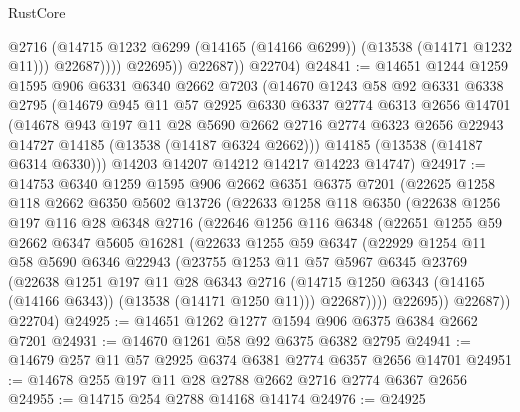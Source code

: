 \begin{lexlean}{RustCore}
\begin{coremodule}
                      @2716
                      (@14715 @1232 @6299 (@14165 (@14166 @6299)) (@13538 (@14171 @1232 @11)))
                      @22687))))
              @22695))
          @22687))
      @22704)
@24841 := @14651
    @1244
    @1259
    @1595
    @906
    @6331
    @6340
    @2662
    @7203
    (@14670
      @1243
      @58
      @92
      @6331
      @6338
      @2795
      (@14679
        @945
        @11
        @57
        @2925
        @6330
        @6337
        @2774
        @6313
        @2656
        @14701
        (@14678
          @943
          @197
          @11
          @28
          @5690
          @2662
          @2716
          @2774
          @6323
          @2656
          @22943
          @14727
          @14185
          (@13538 (@14187 @6324 @2662)))
        @14185
        (@13538 (@14187 @6314 @6330)))
      @14203
      @14207
      @14212
      @14217
      @14223
      @14747)
@24917 := @14753
    @6340
    @1259
    @1595
    @906
    @2662
    @6351
    @6375
    @7201
    (@22625
      @1258
      @118
      @2662
      @6350
      @5602
      @13726
      (@22633
        @1258
        @118
        @6350
        (@22638
          @1256
          @197
          @116
          @28
          @6348
          @2716
          (@22646
            @1256
            @116
            @6348
            (@22651
              @1255
              @59
              @2662
              @6347
              @5605
              @16281
              (@22633
                @1255
                @59
                @6347
                (@22929
                  @1254
                  @11
                  @58
                  @5690
                  @6346
                  @22943
                  (@23755
                    @1253
                    @11
                    @57
                    @5967
                    @6345
                    @23769
                    (@22638
                      @1251
                      @197
                      @11
                      @28
                      @6343
                      @2716
                      (@14715 @1250 @6343 (@14165 (@14166 @6343)) (@13538 (@14171 @1250 @11)))
                      @22687))))
              @22695))
          @22687))
      @22704)
@24925 := @14651 @1262 @1277 @1594 @906 @6375 @6384 @2662 @7201
@24931 := @14670 @1261 @58 @92 @6375 @6382 @2795
@24941 := @14679 @257 @11 @57 @2925 @6374 @6381 @2774 @6357 @2656 @14701
@24951 := @14678 @255 @197 @11 @28 @2788 @2662 @2716 @2774 @6367 @2656
@24955 := @14715 @254 @2788 @14168 @14174
@24976 := @24925

\end{coremodule}
\end{lexlean}
